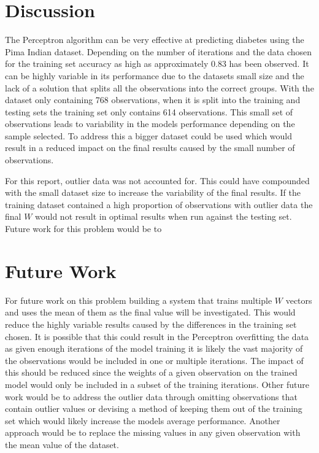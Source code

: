 \documentclass[10pt,twocolumn,letterpaper]{article}
\begin{document}
\section{Discussion}
The Perceptron algorithm can be very effective at predicting diabetes using the Pima Indian dataset. Depending
on the number of iterations and the data chosen for the training set accuracy as high as  approximately 0.83
has been observed. It can be highly variable in its performance due to the datasets small size and the lack
of a solution that splits all the observations into the correct groups. With the dataset only containing 768
observations, when it is split into the training and testing sets the training set only contains 614 observations.
This small set of observations leads to variability in the models performance depending on the sample selected.
To address this a bigger dataset could be used which would result in a reduced impact on the final results
caused by the small number of observations.

For this report, outlier data was not accounted for. This could have compounded with the small dataset size
to increase the variability of the final results. If the training dataset contained a high proportion of
observations with outlier data the final $W$ would not result in optimal results when run against the testing
set. Future work for this problem would be to

\section{Future Work}
For future work on this problem building a system that trains multiple $W$ vectors and uses the mean of them
as the final value will be investigated. This would reduce the highly variable results caused by the differences
in the training set chosen. It is possible that this could result in the Perceptron overfitting the data
as given enough iterations of the model training it is likely the vast majority of the observations would
be included in one or multiple iterations. The impact of this should be reduced since the weights of a given
observation on the trained model would only be included in a subset of the training iterations. Other future work
would be to address the outlier data through omitting observations that
contain outlier values or devising a method of keeping them out of the training set which would likely
increase the models average performance. Another approach would be to replace the missing values in any
given observation with the mean value of the dataset.
\end{document}
